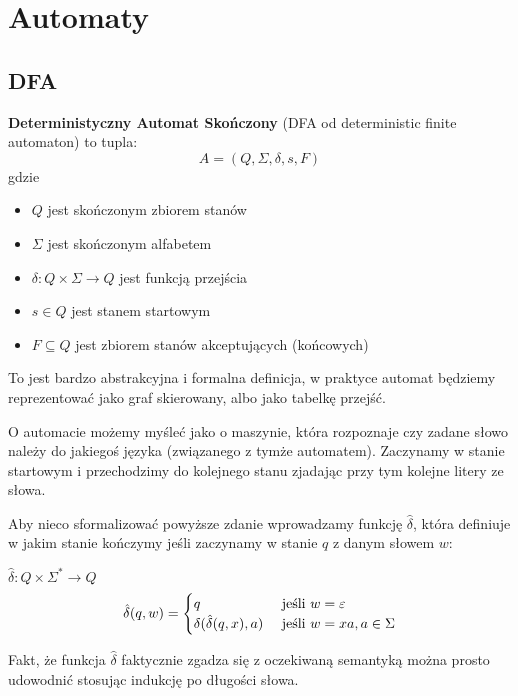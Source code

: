 \section{Automaty}

\subsection{DFA}

\begin{definition}
    \textbf{Deterministyczny Automat Skończony} (DFA od deterministic finite automaton) to tupla:
    \[
        A = (Q, \Sigma, \delta, s, F)
    \]
    gdzie
    \begin{itemize}
        \item \( Q \) jest skończonym zbiorem stanów
        \item \( \Sigma \) jest skończonym alfabetem
        \item \( \delta: Q \times \Sigma \rightarrow Q \) jest funkcją przejścia
        \item \( s \in Q \) jest stanem startowym
        \item \( F \subseteq Q \) jest zbiorem stanów akceptujących (końcowych)
    \end{itemize}
\end{definition}

To jest bardzo abstrakcyjna i formalna definicja, w praktyce automat będziemy reprezentować jako graf skierowany, albo jako tabelkę przejść.

O automacie możemy myśleć jako o maszynie, która rozpoznaje czy zadane słowo należy do jakiegoś języka (związanego z tymże automatem). Zaczynamy w stanie startowym i przechodzimy do kolejnego stanu zjadając przy tym kolejne litery ze słowa.

Aby nieco sformalizować powyższe zdanie wprowadzamy funkcję \( \hat \delta \), która definiuje w jakim stanie kończymy jeśli zaczynamy w stanie \( q \) z danym słowem \( w \):
\begin{definition}
\( \hat \delta : Q \times \Sigma^* \rightarrow Q \)
\[
    \hat \delta(q, w) = \begin{cases}
    q & \text{ jeśli } w = \varepsilon \\
    \delta(\hat \delta(q, x), a) & \text{ jeśli } w = xa, a \in \Sigma \\
    \end{cases}
\]
\end{definition}

Fakt, że funkcja \( \hat \delta \) faktycznie zgadza się z oczekiwaną semantyką można prosto udowodnić stosując indukcję po długości słowa. 

